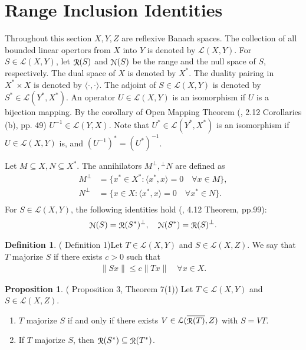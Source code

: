 \documentclass[a4paper,12pt]{article}
\theoremstyle{definition}
\newtheorem{dfn}{Definition}
\newtheorem{prp}{Proposition}
\DeclareMathOperator\img{\EuScript{R}}
\DeclareMathOperator\nul{\EuScript{N}}
\begin{document}
\section{Range Inclusion Identities}
Throughout this section $X, Y, Z$ are reflexive Banach spaces. The collection of all bounded linear opertors from $X$ into $Y$ is denoted by $\mathcal{L}(X, Y)$. For $S\in\mathcal{L}(X, Y)$, let $\img(S)$ and $\nul(S)$ be the range and the null space of $S$, respectively. The dual space of $X$ is denoted by $X^*$. The duality pairing in $X^*\times X$ is denoted by $\langle\cdot,\cdot\rangle$. The adjoint of $S\in\mathcal{L}(X, Y)$ is denoted by $S^*\in\mathcal{L}(Y^*, X^*)$. An operator $U\in\mathcal{L}(X, Y)$ is an isomorphism if $U$ is a bijection mapping. By the corollary of Open Mapping Theorem (\citet{rudinfa}, 2.12 Corollaries (b), pp. 49) $U^{-1}\in\mathcal{L}(Y, X)$. Note that $U^*\in\mathcal{L}(Y^*, X^*)$ is an isomorphism if $U\in\mathcal{L}(X, Y)$ is, and $(U^{-1})^* = (U^*)^{-1}$.

Let $M\subseteq X, N\subseteq X^*$. The annihilators $M^\bot, {}^\bot N$ are defined as
\begin{align*}
  M^\bot &= \{x^*\in X^*: \langle x^*, x\rangle = 0\quad\forall x\in M\}, \\
  N^\bot &= \{x\in X: \langle x^*, x\rangle = 0\quad\forall x^*\in N\}. \\
\end{align*}
For $S\in\mathcal{L}(X, Y)$, the following identities hold (\citet{rudinfa}, 4.12 Theorem, pp.99):
\begin{align}\label{eq:range}
  \nul(S) = \img(S^*)^\bot,\quad\nul(S^*) = \img(S)^\bot.
\end{align}

\begin{dfn}(\citet{barnes} Definition 1)\label{def:major}
  Let $T\in\mathcal{L}(X, Y)$ and $S\in\mathcal{L}(X, Z)$. We say that $T$ majorize $S$ if there exists $c > 0$ such that
  \begin{align*}
    \|S x\|\leqslant c\|T x\|\quad\forall x\in X .
  \end{align*}
\end{dfn}

\begin{prp}\label{thm:major}(\citet{barnes} Proposition 3, Theorem 7(1))
  Let $T\in\mathcal{L}(X, Y)$ and $S\in\mathcal{L}(X, Z)$.
  \begin{enumerate}
    \item $T$ majorize $S$ if and only if there exists $V\in\mathcal{L}(\overline{\img(T)}, Z)$ with $S=VT$.
    \item If $T$ majorize $S$, then $\img(S^*)\subseteq\img(T^*)$.
  \end{enumerate}
\end{prp}
\end{document}
